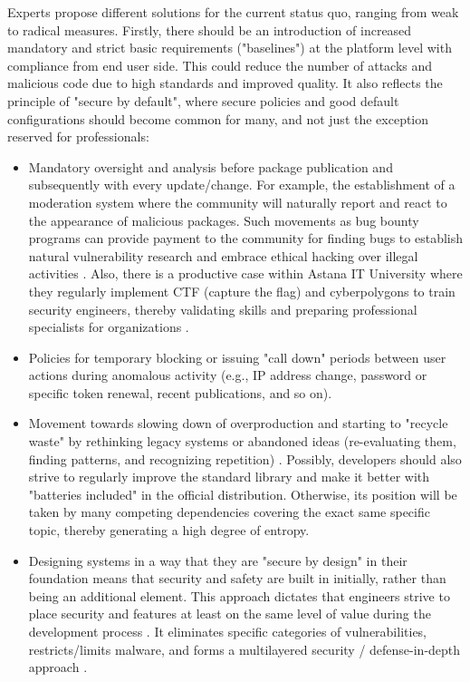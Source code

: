 Experts propose different solutions for the current status quo, ranging from weak to radical measures. Firstly, there should be an introduction of increased mandatory and strict basic requirements ("baselines") at the platform level with compliance from end user side. This could reduce the number of attacks and malicious code due to high standards and improved quality. It also reflects the principle of "secure by default", where secure policies and good default configurations should become common for many, and not just the exception reserved for professionals:
\begin{itemize}
    \item Mandatory oversight and analysis before package publication and subsequently with every update/change. For example, the establishment of a moderation system where the community will naturally report and react to the appearance of malicious packages. Such movements as bug bounty programs can provide payment to the community for finding bugs to establish natural vulnerability research and embrace ethical hacking over illegal activities \cite{bozzini2025regimes}. Also, there is a productive case within Astana IT University where they regularly implement CTF (capture the flag) and cyberpolygons to train security engineers, thereby validating skills and preparing professional specialists for organizations \cite{abdiraman2023comparative}.
    \item Policies for temporary blocking or issuing "call down" periods between user actions during anomalous activity (e.g., IP address change, password or specific token renewal, recent publications, and so on).
    \item Movement towards slowing down of overproduction and starting to "recycle waste" by rethinking legacy systems or abandoned ideas (re-evaluating them, finding patterns, and recognizing repetition) \cite{assuncao2025contemporary}. Possibly, developers should also strive to regularly improve the standard library and make it better with "batteries included" in the official distribution. Otherwise, its position will be taken by many competing dependencies covering the exact same specific topic, thereby generating a high degree of entropy.
    \item Designing systems in a way that they are "secure by design" in their foundation means that security and safety are built in initially, rather than being an additional element. This approach dictates that engineers strive to place security and features at least on the same level of value during the development process \cite{pohl2015secure}. It eliminates specific categories of vulnerabilities, restricts/limits malware, and forms a multilayered security / defense-in-depth approach \cite{mell2016measuring}.

\end{itemize}
